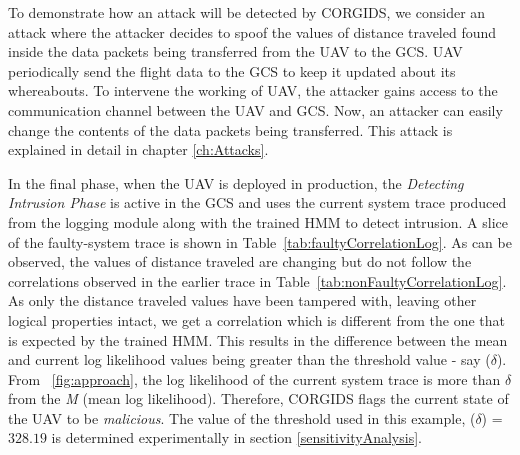 To demonstrate how an attack will be detected by \ac{CORGIDS}, we consider an attack where the attacker decides to spoof the values of distance traveled found inside the data packets being transferred from the \ac{UAV} to the \ac{GCS}. \ac{UAV} periodically send the flight data to the \ac{GCS} to keep it updated about its whereabouts. To intervene the working of \ac{UAV}, the attacker gains access to the communication channel between the \ac{UAV} and \ac{GCS}. Now, an attacker can easily change the contents of the data packets being transferred. This attack is explained in detail in chapter \ref{ch:Attacks}.

In the final phase, when the \ac{UAV} is deployed in production, the \textit{Detecting Intrusion Phase} is active in the \ac{GCS} and uses the current system trace produced from the logging module along with the trained HMM to detect intrusion. A slice of the faulty-system trace is shown in Table~\ref{tab:faultyCorrelationLog}. As can be observed, the values of distance traveled are changing but do not follow the correlations observed in the earlier trace in Table~\ref{tab:nonFaultyCorrelationLog}. As only the distance traveled values have been tampered with, leaving other logical properties intact, we get a correlation which is different from the one that is expected by the trained \ac{HMM}. This results in the difference between the mean and current log likelihood values being greater than the threshold value - say ($\delta$). From ~\autoref{fig:approach}, the log likelihood of the current system trace is more than $\delta$ from the \textit{M} (mean log likelihood). Therefore, \ac{CORGIDS} flags the current state of the \ac{UAV} to be \textit{malicious}. The value of the threshold used in this example, ($\delta$) = $328.19$ is determined experimentally in section \ref{sensitivityAnalysis}. 


\endinput
=====================================================================

